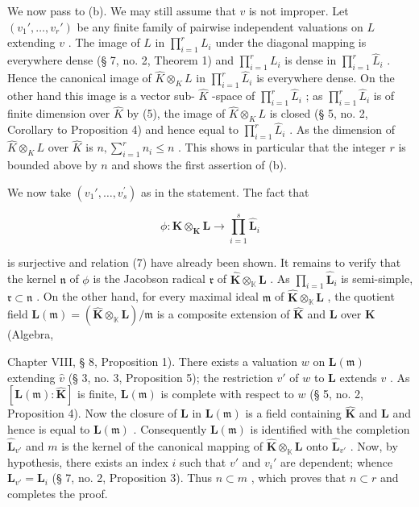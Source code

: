 We now pass to (b). We may still assume that \(v\) is not improper. Let \((v_1', \ldots, v_r')\) be any finite family of pairwise independent valuations on \(L\) extending \(v\) . The image of \(L\) in \(\prod_{i=1}^{r} L_i\) under the diagonal mapping is everywhere dense (§ 7, no. 2, Theorem 1) and \(\prod_{i=1}^{r} L_i\) is dense in \(\prod_{i=1}^{r} \hat{L}_i\) . Hence the canonical image of \(\hat{K} \otimes_K L\) in \(\prod_{i=1}^{r} \hat{L}_i\) is everywhere dense. On the other hand this image is a vector sub- \(\hat{K}\) -space of \(\prod_{i=1}^{r} \hat{L}_i\) ; as \(\prod_{i=1}^{r} \hat{L}_i\) is of finite dimension over \(\hat{K}\) by (5), the image of \(\hat{K} \otimes_K L\) is closed (§ 5, no. 2, Corollary to Proposition 4) and hence equal to \(\prod_{i=1}^{r} \hat{L}_i\) . As the dimension of \(\hat{K} \otimes_K L\) over \(\hat{K}\) is \(n, \sum_{i=1}^{r} n_i \leqslant n\) . This shows in particular that the integer \(r\) is bounded above by \(n\) and shows the first assertion of (b).

We now take \((v_{1}',\ldots ,v_{s}^{\prime})\) as in the statement. The fact that

\[
\phi : \hat {\mathbf {K}} \otimes_ {\mathbf {K}} \mathbf {L} \rightarrow \prod_ {i = 1} ^ {s} \hat {\mathbf {L}} _ {i}
\]

is surjective and relation (7) have already been shown. It remains to verify that the kernel \(\mathfrak{n}\) of \(\phi\) is the Jacobson radical \(\mathfrak{r}\) of \(\hat{\mathbf{K}}\otimes_{\mathbb{K}}\mathbf{L}\) . As \(\prod_{i = 1}\hat{\mathbf{L}}_i\) is semi-simple, \(\mathfrak{r}\subset \mathfrak{n}\) . On the other hand, for every maximal ideal \(\mathfrak{m}\) of \(\hat{\mathbf{K}}\otimes_{\mathbb{K}}\mathbf{L}\) , the quotient field \(\mathbf{L}(\mathfrak{m}) = (\hat{\mathbf{K}}\otimes_{\mathbb{K}}\mathbf{L}) / \mathfrak{m}\) is a composite extension of \(\hat{\mathbf{K}}\) and \(\mathbf{L}\) over \(\mathbf{K}\) (Algebra,

Chapter VIII, § 8, Proposition 1). There exists a valuation \(w\) on \(\mathbf{L}(\mathfrak{m})\) extending \(\hat{v}\) (§ 3, no. 3, Proposition 5); the restriction \(v'\) of \(w\) to \(\mathbf{L}\) extends \(v\) . As \([\mathbf{L}(\mathfrak{m}): \hat{\mathbf{K}}]\) is finite, \(\mathbf{L}(\mathfrak{m})\) is complete with respect to \(w\) (§ 5, no. 2, Proposition 4). Now the closure of \(\mathbf{L}\) in \(\mathbf{L}(\mathfrak{m})\) is a field containing \(\hat{\mathbf{K}}\) and \(\mathbf{L}\) and hence is equal to \(\mathbf{L}(\mathfrak{m})\) . Consequently \(\mathbf{L}(\mathfrak{m})\) is identified with the completion \(\hat{\mathbf{L}}_{v'}\) and \(m\) is the kernel of the canonical mapping of \(\hat{\mathbf{K}} \otimes_{\mathbb{K}} \mathbf{L}\) onto \(\hat{\mathbf{L}}_{v'}\) . Now, by hypothesis, there exists an index \(i\) such that \(v'\) and \(v_i'\) are dependent; whence \(\mathbf{L}_{v'} = \mathbf{L}_i\) (§ 7, no. 2, Proposition 3). Thus \(n \subset m\) , which proves that \(n \subset r\) and completes the proof.

